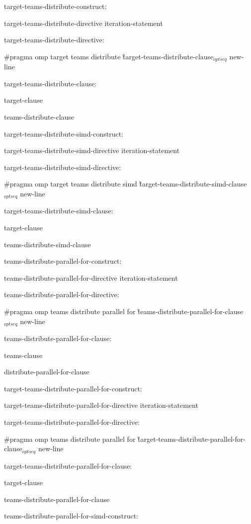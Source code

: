 {\I target-teams-distribute-construct:

\I\I target-teams-distribute-directive iteration-statement

\I target-teams-distribute-directive:

\C\I\I \#pragma omp target teams distribute \G target-teams-distribute-clause$_{optseq}$ new-line

\I target-teams-distribute-clause:

\I\I target-clause

\I\I teams-distribute-clause

\I target-teams-distribute-simd-construct:

\I\I target-teams-distribute-simd-directive iteration-statement

\I target-teams-distribute-simd-directive:

\C \I\I \#pragma omp target teams distribute simd \G target-teams-distribute-simd-clause$_{optseq}$ new-line

\I target-teams-distribute-simd-clause:

\I\I target-clause

\I\I teams-distribute-simd-clause

\I teams-distribute-parallel-for-construct:

\I\I teams-distribute-parallel-for-directive iteration-statement

\I teams-distribute-parallel-for-directive:

\C\I\I \#pragma omp teams distribute parallel for \G teams-distribute-parallel-for-clause$_{optseq}$ new-line

\I teams-distribute-parallel-for-clause:

\I\I teams-clause

\I\I distribute-parallel-for-clause

\I target-teams-distribute-parallel-for-construct:

\I\I target-teams-distribute-parallel-for-directive iteration-statement

\I target-teams-distribute-parallel-for-directive:

\C\I\I \#pragma omp teams distribute parallel for \G target-teams-distribute-parallel-for-clause$_{optseq}$ new-line

\I target-teams-distribute-parallel-for-clause:

\I\I target-clause

\I\I teams-distribute-parallel-for-clause

\I teams-distribute-parallel-for-simd-construct:

}
